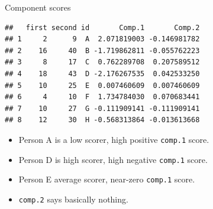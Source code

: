 \begin{frame}[fragile]{Component scores}

\begin{knitrout}
\color{fgcolor}\begin{kframe}
\begin{alltt}
\hlkwb{=}\hlopt{$}
\end{alltt}
\begin{verbatim}
##   first second id       Comp.1       Comp.2
## 1     2      9  A  2.071819003 -0.146981782
## 2    16     40  B -1.719862811 -0.055762223
## 3     8     17  C  0.762289708  0.207589512
## 4    18     43  D -2.176267535  0.042533250
## 5    10     25  E  0.007460609  0.007460609
## 6     4     10  F  1.734784030  0.070683441
## 7    10     27  G -0.111909141 -0.111909141
## 8    12     30  H -0.568313864 -0.013613668
\end{verbatim}
\end{kframe}
\end{knitrout}

\begin{itemize}
\item Person A is a low scorer, high positive \texttt{comp.1} score.
\item Person D is high scorer, high negative \texttt{comp.1} score.
\item Person E average scorer, near-zero \texttt{comp.1} score.
\item \texttt{comp.2} says basically nothing.
\end{itemize}

\end{frame}

